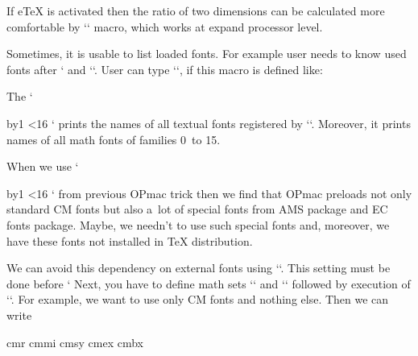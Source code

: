 If eTeX is activated then the ratio of two dimensions can be calculated more comfortable by `\dividedimen` macro, which works at expand processor level. 

\begtt
\def\dividedimen (#1/#2){\expandafter\ignorept\the 
   \dimexpr\numexpr\number\dimexpr#1\relax*65536/\number\dimexpr#2\relax\relax sp\relax 
} 
\def\calculatefontdim#1{%
   \setbox0=\hbox{\thefont #1}%
   \fontdim=\dividedimen(\bw/\wd0)\fontdim 
} 
\endtt

 


Sometimes, it is usable to list loaded fonts. For example user needs to know used fonts after ` and `\typosize[11/13]`. User can type `\showfonts`, if this macro is defined like: 

\begtt
\def\showfonts{\bgroup 
   \def\wterm##1{\immediate\write16{##1}} 
   \def\resizefont##1{\wterm{##1= \fontname##1}}\resizeall 
   \tmpnum=0 \loop 
      \wterm{\the\tmpnum: \fontname\textfont\tmpnum\space/ 
                          \fontname\scriptfont\tmpnum\space/ 
                          \fontname\scriptscriptfont\tmpnum} 
      \advance\tmpnum by1 \ifnum\tmpnum<16 \repeat 
   \egroup} 
\endtt


The `\showfonts` prints the names of all textual fonts registered by `\regfont`. Moreover, it prints names of all math fonts of families 0~to 15. 


 


When we use `\showfonts` from previous OPmac trick then we find that OPmac preloads not only standard CM fonts but also a~lot of special fonts from AMS package and EC fonts package. Maybe, we needn't to use such special fonts and, moreover, we have these fonts not installed in TeX distribution. 



We can avoid this dependency on external fonts using `\let\normalmathloading=\relax`. This setting must be done before ` Next, you have to define math sets `\normalmath` and `\boldmath` followed by execution of `\normalmath`. For example, we want to use only CM fonts and nothing else. Then we can write 

\begtt
\let\normalmathloading=\relax 
 
 
\def\normalmath{%
  \loadmathfamily 0 cmr  %
  \loadmathfamily 1 cmmi %
  \loadmathfamily 2 cmsy %
  \loadmathfamily 3 cmex %
  \loadmathfamily 8 cmbx %
  \setmathfamily  9 \tenbi %
  \setmathfamily 10 \tenrm 
  \setmathfamily 11 \tenit 
  \setmathdimens 
} 
\def\boldmath{%
  \loadmathfamily 0 cmbx  %
  \loadmathfamily 1 cmmib %
  \loadmathfamily 2 cmbsy %
  \loadmathfamily 3 cmex  %
  \loadmathfamily 8 cmbx  %
  \setmathfamily  9 \tenbi %
   \tenrm 
   \tenit 
  \setmathdimens 
} 
\normalmath 
\endtt


